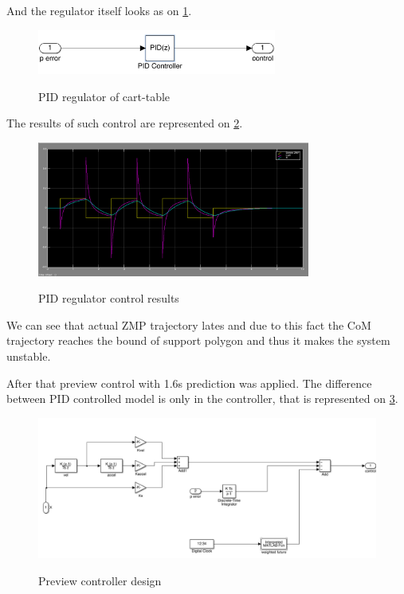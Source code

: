\documentclass[12pt,a4paper]{report}
\begin{document}
		And the regulator itself looks as on \cref{fig:16}.
		
		\begin{figure}[h!]
			\vspace{-0.2cm}
			\centering
			{\includegraphics[width=0.7\textwidth]{16}}
			\caption{PID regulator of cart-table}
			\label{fig:16}
			\vspace{-0.1cm}
		\end{figure}
		
		The results of such control are represented on \cref{fig:17}.
		
		\begin{figure}[h!]
			\vspace{-0.2cm}
			\centering
			{\includegraphics[width=0.8\textwidth]{17}}
			\caption{PID regulator control results}
			\label{fig:17}
			\vspace{-0.1cm}
		\end{figure}
		
		We can see that actual ZMP trajectory lates and due to this fact the CoM trajectory reaches the bound of support polygon and thus it makes the system unstable.
		
		After that preview control with 1.6s prediction was applied. The difference between PID controlled model is only in the controller, that is represented on \cref{fig:18}.
		
		\begin{figure}[h!]
			\vspace{-0.2cm}
			\centering
			{\includegraphics[width=1\textwidth]{18}}
			\caption{Preview controller design}
			\label{fig:18}
			\vspace{-0.1cm}
		\end{figure}
		
\end{document}
